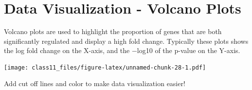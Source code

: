 \documentclass[
]{article}
\newenvironment{Shaded}{\begin{snugshade}}{\end{snugshade}}
\newcommand{\AttributeTok}[1]{\textcolor[rgb]{0.77,0.63,0.00}{#1}}
\newcommand{\FunctionTok}[1]{\textcolor[rgb]{0.00,0.00,0.00}{#1}}
\newcommand{\NormalTok}[1]{#1}
\newcommand{\SpecialCharTok}[1]{\textcolor[rgb]{0.00,0.00,0.00}{#1}}
\newcommand{\StringTok}[1]{\textcolor[rgb]{0.31,0.60,0.02}{#1}}
\begin{document}
\hypertarget{data-visualization---volcano-plots}{%
\section{Data Visualization - Volcano
Plots}\label{data-visualization---volcano-plots}}

Volcano plots are used to highlight the proportion of genes that are
both significantly regulated and display a high fold change. Typically
these plots shows the log fold change on the X-axis, and the −log10 of
the p-value on the Y-axis.

\begin{Shaded}
\end{Shaded}

\texttt{[image: class11\_files/figure-latex/unnamed-chunk-28-1.pdf]}

Add cut off lines and color to make data visualization easier!
\end{document}
